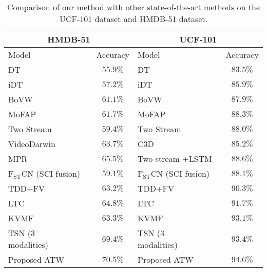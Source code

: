 \documentclass[runningheads,a4paper]{llncs}
\begin{document}
\begin{table*}[t]
 \caption{Comparison of our method with other state-of-the-art methods on the UCF-101 dataset and HMDB-51 dataset.}
 \label{tbl:stoa}
 \begin{center}
	 \begin{small}
	 \begin{tabular}{lc|lc}
	 \toprule
	 \multicolumn{2}{c|}{HMDB-51} & \multicolumn{2}{c}{UCF-101} \\
	 \midrule
	 \multicolumn{1}{l}{Model} & \multicolumn{1}{c|}{Accuracy} &
	 \multicolumn{1}{l}{Model} & \multicolumn{1}{c}{Accuracy} \\
		 \midrule
	 DT \cite{cai2014multi} & $ 55.9\% $ & DT \cite{cai2014multi} & $ 83.5\% $ \\
 	iDT \cite{wang2013action} & $ 57.2\% $ & iDT \cite{wang2013action} & $ 85.9\% $ \\
 	BoVW \cite{peng2016bag} & $ 61.1\% $ & BoVW \cite{peng2016bag} & $ 87.9\% $ \\
 	MoFAP \cite{wang2016mofap} & $ 61.7\% $ & MoFAP \cite{wang2016mofap} & $ 88.3\% $ \\
 	Two Stream \cite{simonyan2014two} & $ 59.4\% $ & Two Stream \cite{simonyan2014two} & $ 88.0\% $ \\
 	VideoDarwin \cite{fernando2015modeling} & $ 63.7\% $ & C3D \cite{tran2015learning} & $ 85.2\% $ \\
 	MPR \cite{ni2015motion} & $ 65.5\% $ & Two stream +LSTM \cite{yue2015beyond} & $ 88.6\% $ \\
 	$\mathrm{F_{ST}CN}$ (SCI fusion) \cite{sun2015human} & $ 59.1\% $ & $\mathrm{F_{ST}CN}$ (SCI fusion)
 	~\cite{sun2015human} & $ 88.1\% $ \\
 	TDD+FV \cite{wang2015action} & $ 63.2\% $ & TDD+FV \cite{wang2015action} & $ 90.3\% $ \\
 	LTC~\cite{varol2017long} & $ 64.8\% $ & LTC~\cite{varol2017long} & $ 91.7\% $ \\
 	KVMF~\cite{zhu2016key} & $ 63.3\% $ & KVMF~\cite{zhu2016key} & $ 93.1\% $ \\
 	TSN (3 modalities)~\cite{wang2016temporal}~~~~~~~~ & $ 69.4\% $ &
 	TSN (3 modalities)~\cite{wang2016temporal}~~~~~~~~ & $ 93.4\% $ \\
	\midrule
 	Proposed ATW & $ \mathbf{70.5}\% $ & Proposed ATW & $ \mathbf{94.6}\% $  \\
	 \bottomrule
   \end{tabular}
	 \end{small}
 \end{center}
\end{table*}
\end{document}
